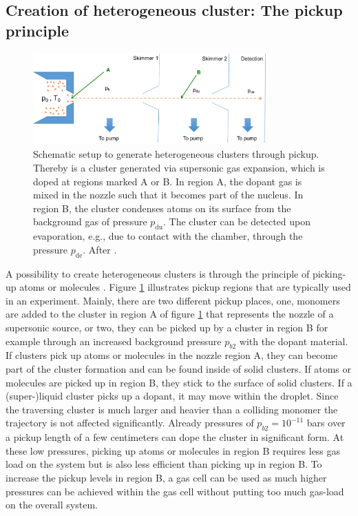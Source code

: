 \subsection{Creation of heterogeneous cluster: The pickup principle}\label{sec:heterogeneous-cluster}
\begin{figure}
	\centering
		\includegraphics[width=0.80\textwidth]{images/pick-up.pdf}
	\caption[Schematic of a pickup (gas-)source.]{Schematic setup to generate heterogeneous clusters through pickup. Thereby is a cluster generated via supersonic gas expansion, which is doped at regions marked A or B. In region A, the dopant gas is mixed in the nozzle such that it becomes part of the nucleus. In region B, the cluster condenses atoms on its surface from the background gas of pressure $p_{\text{du}}$. The cluster can be detected upon evaporation, e.g., due to contact with the chamber, through the pressure $p_{\text{de}}$. After \cite{Gough-1985-JChemPhys,Haberland-1994-Springer}.}
	\label{fig:pickupPrinciple}
\end{figure}
A possibility to create heterogeneous clusters is through the principle of picking-up atoms or molecules \cite{Gough-1985-JChemPhys,Haberland-1994-Springer}. Figure \ref{fig:pickupPrinciple} illustrates pickup regions that are typically used in an experiment. Mainly, there are two different pickup places, one, monomers are added to the cluster in region A of figure \ref{fig:pickupPrinciple} that represents the nozzle of a supersonic source, or two, they can be picked up by a cluster in region B for example through an increased background pressure $p_{b2}$ with the dopant material. If clusters pick up atoms or molecules in the nozzle region A, they can become part of the cluster formation and can be found inside of solid clusters. If atoms or molecules are picked up in region B, they stick to the surface of solid clusters. If a (super-)liquid cluster picks up a dopant, it may move within the droplet. Since the traversing cluster is much larger and heavier than a colliding monomer the trajectory is not affected significantly. Already pressures of $p_{b2}=10^{-11}$ bars over a pickup length of a few centimeters can dope the cluster in significant form. At these low pressures, picking up atoms or molecules in region B requires less gas load on the system but is also less efficient than picking up in region B. To increase the pickup levels in region B, a gas cell can be used as much higher pressures can be achieved within the gas cell without putting too much gas-load on the overall system.\\
